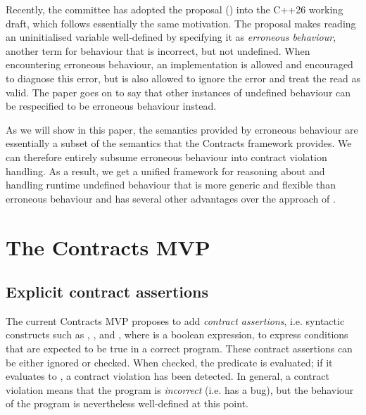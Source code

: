 Recently, the committee has adopted the proposal (\cite{P2795R5}) into the C++26 working draft, which follows essentially the same motivation. The proposal makes reading an uninitialised variable well-defined by specifying it as \emph{erroneous behaviour}, another term for behaviour that is incorrect, but not undefined. When encountering erroneous behaviour, an implementation is allowed and encouraged to diagnose this error, but is also allowed to ignore the error and treat the read as valid. The paper goes on to say that other instances of undefined behaviour can be respecified to be erroneous behaviour instead.

As we will show in this paper, the semantics provided by erroneous behaviour are essentially a subset of the semantics that the Contracts framework provides. We can therefore entirely subsume erroneous behaviour into contract violation handling. As a result, we get a unified framework for reasoning about and handling runtime undefined behaviour that is more generic and flexible than erroneous behaviour and has several other advantages over the approach of \cite{P2795R5}.

\section{The Contracts MVP}
\subsection{Explicit contract assertions}

The current Contracts MVP \cite{P2900R6} proposes to add \emph{contract assertions}, i.e. syntactic constructs such as , , and , where  is a boolean expression, to express conditions that are expected to be true in a correct program. These contract assertions can be either ignored or checked. When checked, the predicate  is evaluated; if it evaluates to , a contract violation has been detected. In general, a contract violation means that the program is \emph{incorrect} (i.e. has a bug), but the behaviour of the program is nevertheless well-defined at this point. 

